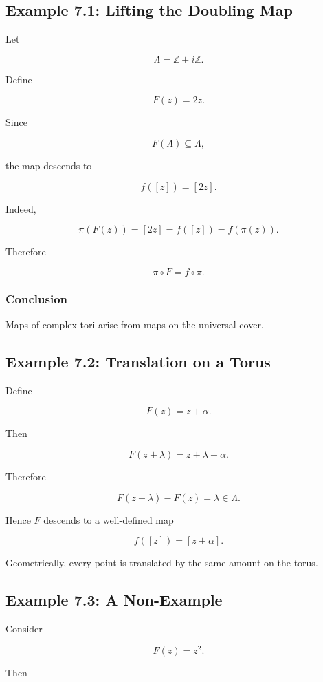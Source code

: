 \documentclass[12pt,a4paper]{article}
\theoremstyle{notespace}
\begin{document}
\subsection{Example 7.1: Lifting the Doubling Map}

Let

\[
\Lambda
=
\mathbb Z+i\mathbb Z.
\]

Define

\[
F(z)=2z.
\]

Since

\[
F(\Lambda)\subseteq\Lambda,
\]

the map descends to

\[
f([z])
=
[2z].
\]

Indeed,

\[
\pi(F(z))
=
[2z]
=
f([z])
=
f(\pi(z)).
\]

Therefore

\[
\boxed{
	\pi\circ F
	=
	f\circ\pi.
}
\]

\subsubsection*{Conclusion}

Maps of complex tori arise from maps on the universal cover.

\subsection{Example 7.2: Translation on a Torus}

Define

\[
F(z)=z+\alpha.
\]

Then

\[
F(z+\lambda)
=
z+\lambda+\alpha.
\]

Therefore

\[
F(z+\lambda)-F(z)
=
\lambda
\in
\Lambda.
\]

Hence \(F\) descends to a well-defined map

\[
f([z])
=
[z+\alpha].
\]

Geometrically, every point is translated by the same amount on the torus.

\subsection{Example 7.3: A Non-Example}

Consider

\[
F(z)=z^2.
\]

Then
\end{document}
